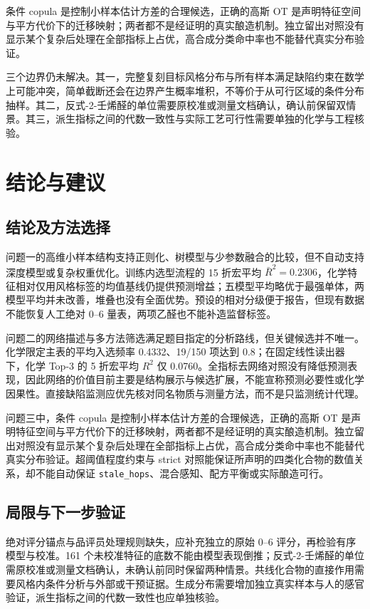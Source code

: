 \documentclass[UTF8,a4paper,zihao=-4]{ctexart}
\numberwithin{figure}{section}
\numberwithin{table}{section}
\numberwithin{equation}{section}
\newcommand{\file}[1]{\texttt{#1}}
\begin{document}
条件 copula 是控制小样本估计方差的合理候选，正确的高斯 OT 是声明特征空间与平方代价下的迁移映射；两者都不是经证明的真实酿造机制。独立留出对照没有显示某个复杂后处理在全部指标上占优，高合成分类命中率也不能替代真实分布验证。

三个边界仍未解决。其一，完整复刻目标风格分布与所有样本满足缺陷约束在数学上可能冲突，简单截断还会在边界产生概率堆积，不等价于从可行区域的条件分布抽样。其二，反式-2-壬烯醛的单位需要原校准或测量文档确认，确认前保留双情景。其三，派生指标之间的代数一致性与实际工艺可行性需要单独的化学与工程核验。

\section{结论与建议}
\label{sec:conclusion}

\subsection{结论及方法选择}

问题一的高维小样本结构支持正则化、树模型与少参数融合的比较，但不自动支持深度模型或复杂权重优化。训练内选型流程的 15 折宏平均 $\bar R^2=0.2306$，化学特征相对仅用风格标签的均值基线仍提供预测增益；五模型平均略优于最强单体，两模型平均并未改善，堆叠也没有全面优势。预设的相对分级便于报告，但现有数据不能恢复人工绝对 0--6 量表，两项乙醛也不能补造监督标签。

问题二的网络描述与多方法筛选满足题目指定的分析路线，但关键候选并不唯一。化学限定主表的平均入选频率 0.4332、19/150 项达到 0.8；在固定线性读出器下，化学 Top-3 的 5 折宏平均 $R^2$ 仅 0.0760。全指标去网络对照没有降低预测表现，因此网络的价值目前主要是结构展示与候选扩展，不能宣称预测必要性或化学因果性。直接缺陷监测应优先核对同名物质与测量方法，而不是只监测统计代理。

问题三中，条件 copula 是控制小样本估计方差的合理候选，正确的高斯 OT 是声明特征空间与平方代价下的迁移映射，两者都不是经证明的真实酿造机制。独立留出对照没有显示某个复杂后处理在全部指标上占优，高合成分类命中率也不能替代真实分布验证。超阈值程度约束与 strict 对照能保证所声明的四类化合物的数值关系，却不能自动保证 \file{stale\_hops}、混合感知、配方平衡或实际酿造可行。

\subsection{局限与下一步验证}

绝对评分锚点与品评员处理规则缺失，应补充独立的原始 0--6 评分，再检验有序模型与校准。161 个未校准特征的底数不能由模型表现倒推；反式-2-壬烯醛的单位需原校准或测量文档确认，未确认前同时保留两种情景。共线化合物的直接作用需要风格内条件分析与外部或干预证据。生成分布需要增加独立真实样本与人的感官验证，派生指标之间的代数一致性也应单独核验。
\end{document}
